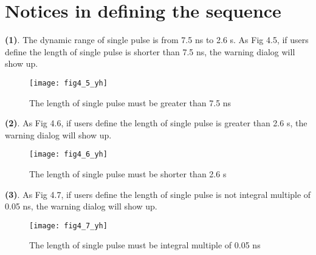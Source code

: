 \newpage
\section{\heiti Notices in defining the sequence}

\vspace{0.4cm}
\noindent \textbf{(1)}. The dynamic range of single pulse is from 7.5 ns to 2.6 s. As Fig 4.5, if users define the length of single pulse is shorter than 7.5 ns, the warning dialog will show up.

\vspace{0.2cm}
\begin{figure}[H]
\centering
\texttt{[image: fig4\_5\_yh]}
\caption{The length of single pulse must be greater than 7.5 ns}
\end{figure}
 
\vspace{0.4cm}
\noindent \textbf{(2)}.  As Fig 4.6, if users define the length of single pulse is greater than 2.6 s, the warning dialog will show up. 

\vspace{0.2cm}
\begin{figure}[ht]
\centering
\texttt{[image: fig4\_6\_yh]}
\caption{The length of single pulse must be shorter than 2.6 s}
\end{figure}

\vspace{0.4cm}
\noindent \textbf{(3)}. As Fig 4.7, if users define the length of single pulse is not integral multiple of 0.05 ns, the warning dialog will show up.

\vspace{0.2cm}
\begin{figure}[H]
\centering
\texttt{[image: fig4\_7\_yh]}
\caption{The length of single pulse must be integral multiple of 0.05 ns}
\end{figure}

